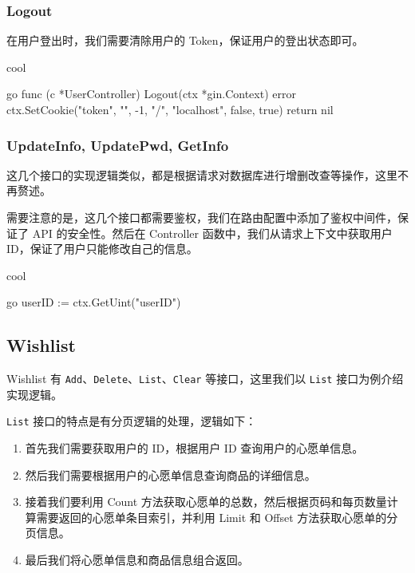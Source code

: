 \subsubsection{Logout}

在用户登出时，我们需要清除用户的 Token，保证用户的登出状态即可。

\begin{codebox}{}{cool}
\begin{amzcode}{go}
func (c *UserController) Logout(ctx *gin.Context) error {
	ctx.SetCookie("token", "", -1, "/", "localhost", false, true)
	return nil
}
\end{amzcode}
\end{codebox}

\subsubsection{UpdateInfo, UpdatePwd, GetInfo}

这几个接口的实现逻辑类似，都是根据请求对数据库进行增删改查等操作，这里不再赘述。

需要注意的是，这几个接口都需要鉴权，我们在路由配置中添加了鉴权中间件，保证了 API 的安全性。然后在 Controller 函数中，我们从请求上下文中获取用户 ID，保证了用户只能修改自己的信息。

\begin{codebox}{}{cool}
\begin{amzcode}{go}
	userID := ctx.GetUint("userID")
\end{amzcode}
\end{codebox}

\subsection{Wishlist}

Wishlist 有 \texttt{Add}、\texttt{Delete}、\texttt{List}、\texttt{Clear} 等接口，这里我们以 \texttt{List} 接口为例介绍实现逻辑。

\texttt{List} 接口的特点是有分页逻辑的处理，逻辑如下：

\begin{enumerate}
  \item 首先我们需要获取用户的 ID，根据用户 ID 查询用户的心愿单信息。
  \item 然后我们需要根据用户的心愿单信息查询商品的详细信息。
  \item 接着我们要利用 Count 方法获取心愿单的总数，然后根据页码和每页数量计算需要返回的心愿单条目索引，并利用 Limit 和 Offset 方法获取心愿单的分页信息。
  \item 最后我们将心愿单信息和商品信息组合返回。
\end{enumerate}


